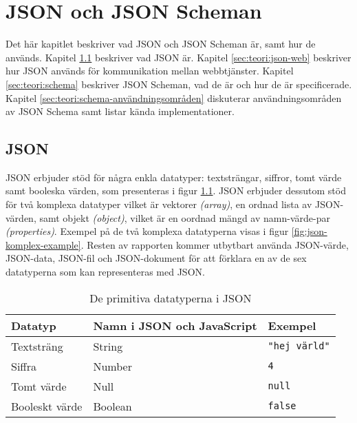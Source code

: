 \chapter{JSON och JSON Scheman}
\label{sec:teori}
Det här kapitlet beskriver vad JSON och JSON Scheman är, samt hur de används. Kapitel \ref{sec:teori:json} beskriver vad JSON är. Kapitel \ref{sec:teori:json-web} beskriver hur JSON används för kommunikation mellan webbtjänster. Kapitel \ref{sec:teori:schema} beskriver JSON Scheman, vad de är och hur de är specificerade. Kapitel \ref{sec:teori:schema-användningsområden} diskuterar användningsområden av JSON Schema samt listar kända implementationer.

\section{JSON}
\label{sec:teori:json}
JSON erbjuder stöd för några enkla datatyper: textsträngar,  siffror, tomt värde samt booleska värden, som presenteras i figur \ref{tab:json-primitives}. JSON erbjuder dessutom stöd för två komplexa datatyper vilket är vektorer \textit{(array)}, en ordnad lista av JSON-värden, samt objekt \textit{(object)}, vilket är en oordnad mängd av namn-värde-par \textit{(properties)}. Exempel på de två komplexa datatyperna visas i figur \ref{fig:json-komplex-example}. Resten av rapporten kommer utbytbart använda JSON-värde, JSON-data, JSON-fil och JSON-dokument för att förklara en av de sex datatyperna som kan representeras med JSON.

\begin{table}
	\centering
	\caption{De primitiva datatyperna i JSON}
	\label{tab:json-primitives}
	\begin{tabular}{ | l | l | p{2.2cm} | }
		\hline
		Datatyp & Namn i JSON och JavaScript & Exempel \\
		\hline
		Textsträng & String & \texttt{"hej värld"} \\
		\hline
		Siffra & Number & \texttt{4} \\
		\hline
		Tomt värde & Null & \texttt{null} \\
		\hline
		Booleskt värde & Boolean & \texttt{false} \\
		\hline
	\end{tabular}
\end{table}

